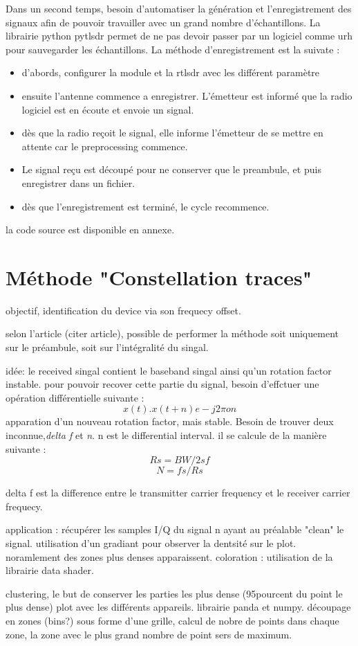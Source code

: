 Dans un second temps, besoin d'automatiser la génération et l'enregistrement des signaux afin de pouvoir travailler avec un grand nombre d'échantillons. La librairie python pytlsdr permet de ne pas devoir passer par un logiciel comme urh pour sauvegarder les échantillons. La méthode d'enregistrement est la suivate :

\begin{itemize}
\item d'abords, configurer la module et la rtlsdr avec les différent paramètre
\item ensuite l'antenne commence a enregistrer. L'émetteur est informé que la radio logiciel est en écoute et envoie un signal. 
\item dès que la radio reçoit le signal, elle informe l'émetteur de se mettre en attente car le preprocessing commence.
\item Le signal reçu est découpé pour ne conserver que le preambule, et puis enregistrer dans un fichier.
\item dès que l'enregistrement est terminé, le cycle recommence.
\end{itemize}

la code source est disponible en annexe.


\section{Méthode "Constellation traces"}

objectif, identification du device via son frequecy offset.

selon l'article (citer article), possible de performer la méthode soit uniquement sur le  préambule, soit sur l'intégralité du singal. 

idée: le received singal contient le baseband singal ainsi qu'un rotation factor instable. pour pouvoir recover cette partie du signal, besoin d'effctuer une opération différentielle suivante : $$ x(t) . x(t+n) e -j2\pi on $$
apparation d'un nouveau rotation factor, mais stable. Besoin de trouver deux inconnue,\textit{delta f} et \textit{n}. n est le differential interval. il se calcule de la manière suivante : $$ Rs = BW / 2sf $$ 
$$ N = fs / Rs $$

delta f est la difference entre le transmitter carrier frequency et le receiver carrier frequecy.

application : récupérer les samples I/Q du signal n ayant au préalable "clean" le signal. utilisation d'un gradiant pour observer la dentsité sur le plot. noramlement des zones plus denses apparaissent.
coloration : utilisation de la librairie data shader. 


clustering, le but de conserver les parties les plus dense (95pourcent du point le plus dense) plot avec les différents appareils.
librairie panda et numpy. découpage en zones (bins?) sous forme d'une grille, calcul de nobre de points dans chaque zone, la zone avec le plus grand nombre de point sers de maximum. 
